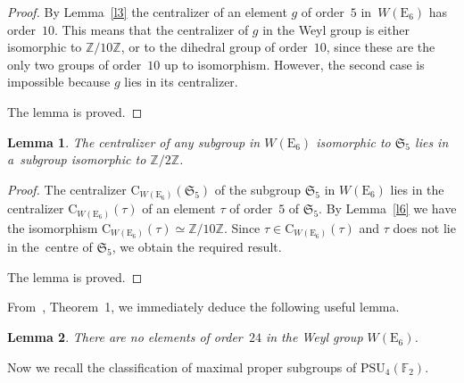 \documentclass{amsart}
\numberwithin{equation}{section}
\theoremstyle{plain}
\newtheorem{lemma}{Lemma}
\theoremstyle{definition}
\theoremstyle{remark}
\begin{document}
\begin{proof}
By Lemma~\ref{l3} the centralizer of an element $g$ of order~$5$ in~$W(\mathrm{E}_6)$ has order~$10$. This means that the centralizer of $g$ in the Weyl group is either isomorphic to $\mathbb{Z}/10\mathbb{Z}$, or to the dihedral group of order~$10$, since these are
the only two groups of order~$10$ up to isomorphism. However, the second case is impossible because $g$ lies in its centralizer.

The lemma is proved.
\end{proof}

\begin{lemma}
\label{l7}
The centralizer of any subgroup in $W(\mathrm{E}_6)$ isomorphic to $\mathfrak{S}_5$ lies in a~subgroup isomorphic to $\mathbb{Z}/2\mathbb{Z}$.
\end{lemma}

\begin{proof}
The centralizer $\mathrm{C}_{W(\mathrm{E}_6)}(\mathfrak{S}_5)$ of the subgroup $\mathfrak{S}_5$ in $W(\mathrm{E}_6)$ lies in the centralizer $\mathrm{C}_{W(\mathrm{E}_6)}(\tau)$ of an element $\tau$ of order~$5$ of $\mathfrak{S}_5$. By Lemma~\ref{l6} we have the isomorphism $\mathrm{C}_{W(\mathrm{E}_6)}(\tau) \simeq \mathbb{Z}/10\mathbb{Z}$. Since
$\tau \in \mathrm{C}_{W(\mathrm{E}_6)}(\tau)$ and $\tau$ does not lie in the~centre of
$\mathfrak{S}_5$, we obtain the required result.

The lemma is proved.
\end{proof}

\goodbreak

From~\cite{17}, Theorem~1, we immediately deduce the following useful lemma.

\begin{lemma}
\label{l8}
There are no elements of order~$24$ in the Weyl group $W(\mathrm{E}_6)$.
\end{lemma}

Now we recall the classification of maximal proper subgroups of $\mathrm{PSU}_4(\mathbb{F}_2)$.
\end{document}
